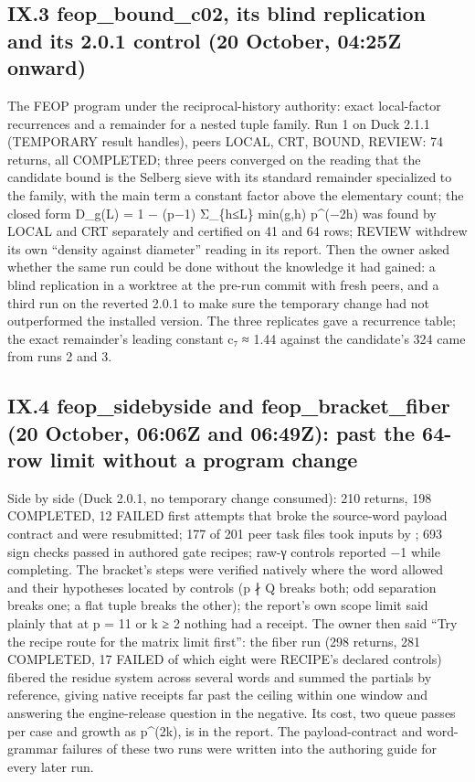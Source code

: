 \subsection{IX.3 feop\_bound\_c02, its blind replication and its 2.0.1 control (20 October, 04:25Z onward)}\label{ix.3-feop_bound_c02-its-blind-replication-and-its-2.0.1-control-20-october-0425z-onward}

The FEOP program under the reciprocal-history authority: exact local-factor recurrences and a remainder for a nested tuple family. Run 1 on
Duck 2.1.1 (TEMPORARY result handles), peers LOCAL, CRT, BOUND, REVIEW: 74 returns, all COMPLETED; three peers converged on the reading that
the candidate bound is the Selberg sieve with its standard remainder specialized to the family, with the main term a constant factor above
the elementary count; the closed form D\_g(L) = 1 − (p−1) Σ\_\{h≤L\} min(g,h) p\^{}(−2h) was found by LOCAL and CRT separately and certified on 41 and
64 rows; REVIEW withdrew its own ``density against diameter'' reading in its report. Then the owner asked whether the same run could be done
without the knowledge it had gained: a blind replication in a worktree at the pre-run commit with fresh peers, and a third run on the
reverted 2.0.1 to make sure the temporary change had not outperformed the installed version. The three replicates gave a recurrence table;
the exact remainder's leading constant c₇ ≈ 1.44 against the candidate's 324 came from runs 2 and 3.

\subsection{IX.4 feop\_sidebyside and feop\_bracket\_fiber (20 October, 06:06Z and 06:49Z): past the 64-row limit without a program change}\label{ix.4-feop_sidebyside-and-feop_bracket_fiber-20-october-0606z-and-0649z-past-the-64-row-limit-without-a-program-change}

Side by side (Duck 2.0.1, no temporary change consumed): 210 returns, 198 COMPLETED, 12 FAILED first attempts that broke the source-word payload
contract and were resubmitted; 177 of 201 peer task files took inputs by ; 693 sign checks passed in authored gate recipes; raw-γ
controls reported −1 while completing. The bracket's steps were verified natively where the word allowed and their hypotheses located by
controls (p ∤ Q breaks both; odd separation breaks one; a flat tuple breaks the other); the report's own scope limit said plainly that at
p = 11 or k ≥ 2 nothing had a receipt. The owner then said ``Try the recipe route for the matrix limit first'': the fiber run (298 returns,
281 COMPLETED, 17 FAILED of which eight were RECIPE's declared controls) fibered the residue system across several words and summed the
partials by reference, giving native receipts far past the ceiling within one window and answering the engine-release question in the
negative. Its cost, two queue passes per case and growth as p\^{}(2k), is in the report. The payload-contract and word-grammar failures of these
two runs were written into the authoring guide for every later run.

